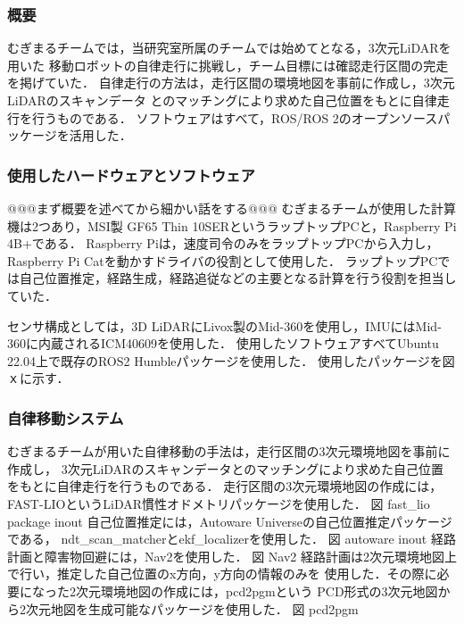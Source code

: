 \documentclass[twocolumn,9pt]{jsproceedings}
\begin{document}
\subsubsection{概要}

むぎまるチームでは，当研究室所属のチームでは始めてとなる，3次元LiDARを用いた
移動ロボットの自律走行に挑戦し，チーム目標には確認走行区間の完走を掲げていた．
自律走行の方法は，走行区間の環境地図を事前に作成し，3次元LiDARのスキャンデータ
とのマッチングにより求めた自己位置をもとに自律走行を行うものである．
ソフトウェアはすべて，ROS/ROS 2のオープンソースパッケージを活用した．

\subsubsection{使用したハードウェアとソフトウェア}

@@@まず概要を述べてから細かい話をする@@@
むぎまるチームが使用した計算機は2つあり，MSI製 GF65 Thin 10SERというラップトップPCと，Raspberry Pi 4B+である．
Raspberry Piは，速度司令のみをラップトップPCから入力し，Raspberry Pi Catを動かすドライバの役割として使用した．
ラップトップPCでは自己位置推定，経路生成，経路追従などの主要となる計算を行う役割を担当していた．

センサ構成としては，3D LiDARにLivox製のMid-360を使用し，IMUにはMid-360に内蔵されるICM40609を使用した．
使用したソフトウェアすべてUbuntu 22.04上で既存のROS2 Humbleパッケージを使用した．
使用したパッケージを図ｘに示す．

\subsubsection{自律移動システム}

むぎまるチームが用いた自律移動の手法は，走行区間の3次元環境地図を事前に作成し，
3次元LiDARのスキャンデータとのマッチングにより求めた自己位置
をもとに自律走行を行うものである．
走行区間の3次元環境地図の作成には，FAST-LIOというLiDAR慣性オドメトリパッケージを使用した．
図 fast\_lio package inout
自己位置推定には，Autoware Universeの自己位置推定パッケージである，
ndt\_scan\_matcherとekf\_localizerを使用した．
図 autoware inout
経路計画と障害物回避には，Nav2を使用した．
図 Nav2
経路計画は2次元環境地図上で行い，推定した自己位置のx方向，y方向の情報のみを
使用した．その際に必要になった2次元環境地図の作成には，pcd2pgmという
PCD形式の3次元地図から2次元地図を生成可能なパッケージを使用した．
図 pcd2pgm
\end{document}

